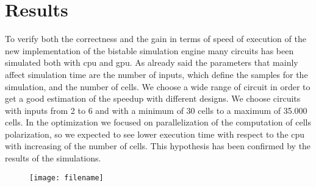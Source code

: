 \chapter{Results}\label{sec:results}
To verify both the correctness and the gain in terms of speed of execution of the new implementation of the bistable simulation engine many circuits has been simulated both with cpu and gpu.
As already said the parameters that mainly affect simulation time are the number of inputs, which define the samples for the simulation, and the number of cells. We choose a wide range of circuit in order to get a good estimation of the speedup with different designs. We choose circuits with inputs from 2 to 6 and with a minimum of 30 cells to a maximum of 35.000 cells. \newline
In the optimization we focused on parallelization of the computation of cells polarization, so we expected to see lower execution time with respect to the cpu with increasing of the number of cells. This hypothesis has been confirmed by the results of the simulations.

\begin{figure}
\texttt{[image: filename]}%
\label{graph1}
\end{figure}